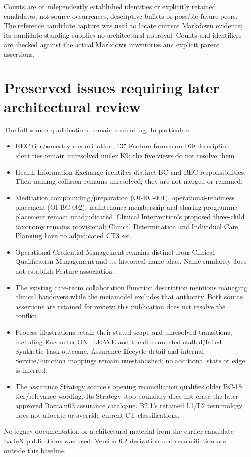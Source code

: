 Counts are of independently established identities or explicitly retained candidates,
not source occurrences, descriptive bullets or possible future peers. The reference
candidate capture was used to locate current Markdown evidence; its candidate
standing supplies no architectural approval. Counts and identifiers are checked
against the actual Markdown inventories and explicit parent assertions.

\section{Preserved issues requiring later architectural review}

The full source qualifications remain controlling. In particular:
\begin{itemize}
\item BEC tier/ancestry reconciliation, 137 Feature frames and 69 description
identities remain unresolved under K9; the five views do not resolve them.
\item Health Information Exchange identifies distinct BC and BEC responsibilities.
Their naming collision remains unresolved; they are not merged or renamed.
\item Medication compounding/preparation (OI-BC-001), operational-readiness
placement (OI-BC-002), maintenance membership and sharing-programme placement
remain unadjudicated. Clinical Intervention's proposed three-child taxonomy
remains provisional; Clinical Determination and Individual Care Planning have
no adjudicated CT3 set.
\item Operational Credential Management remains distinct from Clinical
Qualification Management and its historical name alias. Name similarity does
not establish Feature association.
\item The existing care-team collaboration Function description mentions managing
clinical handovers while the metamodel excludes that authority. Both source
assertions are retained for review; this publication does not resolve the conflict.
\item Process illustrations retain their stated scope and unresolved transitions,
including Encounter ON\_LEAVE and the disconnected stalled/failed Synthetic Task
outcome. Assurance lifecycle detail and internal Service/Function mappings remain
unestablished; no additional state or edge is inferred.
\item The assurance Strategy source's opening reconciliation qualifies older BC-18
tier/relevance wording. Its Strategy stop boundary does not erase the later
approved Domain03 assurance catalogue. B2.1's retained L1/L2 terminology does not
allocate or override current CT classifications.
\end{itemize}

No legacy documentation or architectural material from the earlier candidate LaTeX
publications was used. Version 0.2 derivation and reconciliation are outside this baseline.

